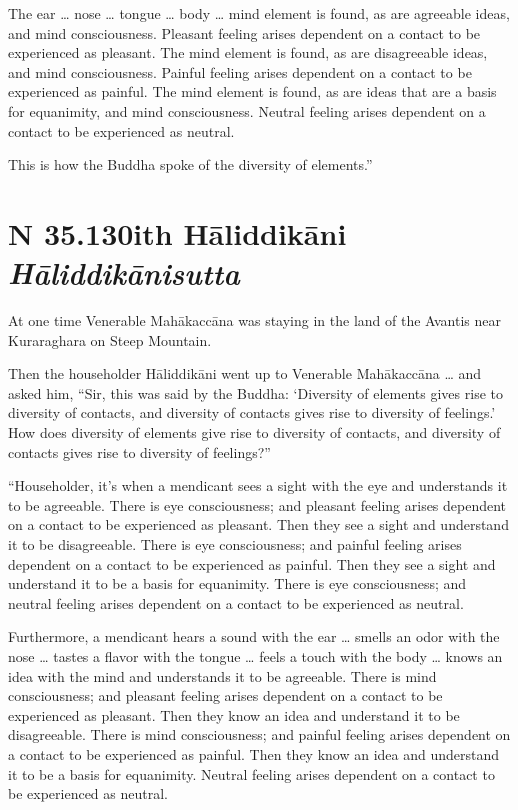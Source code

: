 \documentclass[12pt,openany]{book}%
\newcommand*{\suttatitleacronym}[1]{\smaller[2]{#1}\vspace*{.3em}}
\newcommand*{\suttatitletranslation}[1]{\linebreak{#1}}
\newcommand*{\suttatitleroot}[1]{\linebreak\smaller[2]\itshape{#1}}
\newcommand*{\tocacronym}[1]{\hspace*{-3.3em}{#1}\quad}
\newcommand*{\toctranslation}[1]{#1}
\newcommand*{\tocroot}[1]{(\textit{#1})}
\begin{document}
The ear … nose … tongue … body … mind element is found, as are agreeable ideas, and mind consciousness. Pleasant feeling arises dependent on a contact to be experienced as pleasant. The mind element is found, as are disagreeable ideas, and mind consciousness. Painful feeling arises dependent on a contact to be experienced as painful. The mind element is found, as are ideas that are a basis for equanimity, and mind consciousness. Neutral feeling arises dependent on a contact to be experienced as neutral. 

This is how the Buddha spoke of the diversity of elements.” 

%
\section*{{\suttatitleacronym SN 35.130}{\suttatitletranslation With Hāliddikāni }{\suttatitleroot Hāliddikānisutta}}
\addcontentsline{toc}{section}{\tocacronym{SN 35.130} \toctranslation{With Hāliddikāni } \tocroot{Hāliddikānisutta}}

At one time Venerable \textsanskrit{Mahākaccāna} was staying in the land of the Avantis near Kuraraghara on Steep Mountain. 

Then the householder \textsanskrit{Hāliddikāni} went up to Venerable \textsanskrit{Mahākaccāna} … and asked him, “Sir, this was said by the Buddha: ‘Diversity of elements gives rise to diversity of contacts, and diversity of contacts gives rise to diversity of feelings.’ How does diversity of elements give rise to diversity of contacts, and diversity of contacts gives rise to diversity of feelings?” 

“Householder, it’s when a mendicant sees a sight with the eye and understands it to be agreeable. There is eye consciousness; and pleasant feeling arises dependent on a contact to be experienced as pleasant. Then they see a sight and understand it to be disagreeable. There is eye consciousness; and painful feeling arises dependent on a contact to be experienced as painful. Then they see a sight and understand it to be a basis for equanimity. There is eye consciousness; and neutral feeling arises dependent on a contact to be experienced as neutral. 

Furthermore, a mendicant hears a sound with the ear … smells an odor with the nose … tastes a flavor with the tongue … feels a touch with the body … knows an idea with the mind and understands it to be agreeable. There is mind consciousness; and pleasant feeling arises dependent on a contact to be experienced as pleasant. Then they know an idea and understand it to be disagreeable. There is mind consciousness; and painful feeling arises dependent on a contact to be experienced as painful. Then they know an idea and understand it to be a basis for equanimity. Neutral feeling arises dependent on a contact to be experienced as neutral. 
\end{document}
